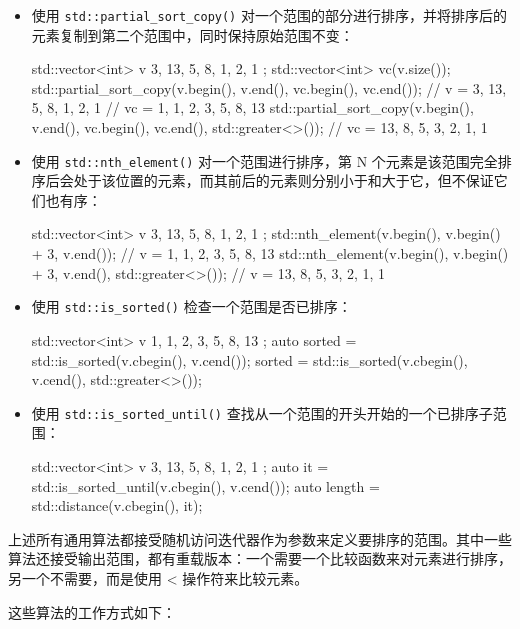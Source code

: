 \begin{itemize}
\item
使用 \verb|std::partial_sort_copy()| 对一个范围的部分进行排序，并将排序后的元素复制到第二个范围中，同时保持原始范围不变：

\begin{cpp}
std::vector<int> v{ 3, 13, 5, 8, 1, 2, 1 };
std::vector<int> vc(v.size());
std::partial_sort_copy(v.begin(), v.end(), vc.begin(), vc.end());
// v = {3, 13, 5, 8, 1, 2, 1}
// vc = {1, 1, 2, 3, 5, 8, 13}
std::partial_sort_copy(v.begin(), v.end(),
                       vc.begin(), vc.end(),
                       std::greater<>());
// vc = {13, 8, 5, 3, 2, 1, 1}
\end{cpp}

\item
使用 \verb|std::nth_element()| 对一个范围进行排序，第 N 个元素是该范围完全排序后会处于该位置的元素，而其前后的元素则分别小于和大于它，但不保证它们也有序：

\begin{cpp}
std::vector<int> v{ 3, 13, 5, 8, 1, 2, 1 };
std::nth_element(v.begin(), v.begin() + 3, v.end());
// v = {1, 1, 2, 3, 5, 8, 13}
std::nth_element(v.begin(), v.begin() + 3, v.end(), std::greater<>());
// v = {13, 8, 5, 3, 2, 1, 1}
\end{cpp}

\item
使用 \verb|std::is_sorted()| 检查一个范围是否已排序：

\begin{cpp}
std::vector<int> v { 1, 1, 2, 3, 5, 8, 13 };
auto sorted = std::is_sorted(v.cbegin(), v.cend());
sorted = std::is_sorted(v.cbegin(), v.cend(), std::greater<>());
\end{cpp}

\item
使用 \verb|std::is_sorted_until()| 查找从一个范围的开头开始的一个已排序子范围：

\begin{cpp}
std::vector<int> v{ 3, 13, 5, 8, 1, 2, 1 };
auto it = std::is_sorted_until(v.cbegin(), v.cend());
auto length = std::distance(v.cbegin(), it);
\end{cpp}
\end{itemize}


上述所有通用算法都接受随机访问迭代器作为参数来定义要排序的范围。其中一些算法还接受输出范围，都有重载版本：一个需要一个比较函数来对元素进行排序，另一个不需要，而是使用 < 操作符来比较元素。

这些算法的工作方式如下：


